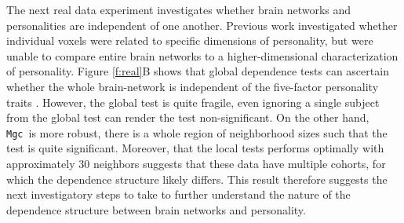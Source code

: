 \documentclass[11pt]{article}
\providecommand{\sct}[1]{{\sc \texttt{#1}}}
\newcommand{\Migraine}{\sct{Migraine}}
\newcommand{\mtg}{\sct{m2g}}
\newcommand{\Mgc}{\sct{Mgc}}
\newcommand{\Hhg}{\sct{Hhg}}
\newcommand{\Mantel}{\sct{Mantel}}
\begin{document}
The next real data experiment investigates whether brain networks and personalities are independent of one another. Previous work \cite{AdelsteinEtAl2011} investigated whether individual voxels were related to specific dimensions of personality, but were unable to compare entire brain networks to a higher-dimensional characterization of personality.  Figure \ref{f:real}B shows that  global dependence tests can ascertain whether the whole brain-network is independent of the five-factor personality traits  \cite{Costa1992}.  However, the global test is quite fragile, even ignoring a single subject from the global test can render the test non-significant.  On the other hand, \Mgc~is more robust, there is a whole region of neighborhood sizes such that the test is quite significant.  Moreover, that the local tests performs optimally with approximately 30 neighbors suggests that these data have multiple cohorts, for which the dependence structure likely differs.  This result therefore suggests  the next investigatory steps to take to further understand the nature of the dependence structure between brain networks and personality.





\end{document}
